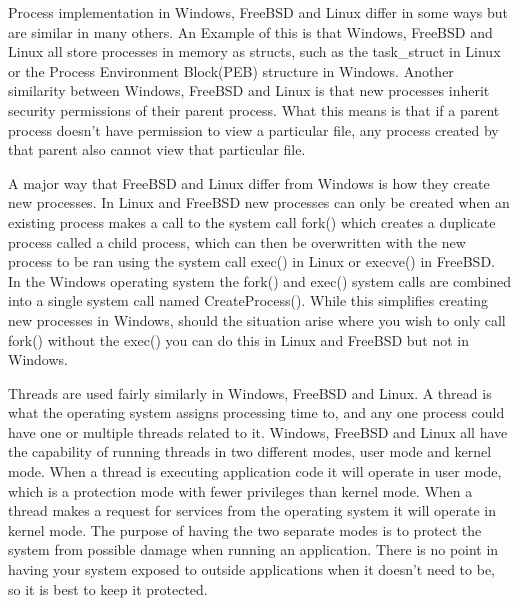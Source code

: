 \documentclass[10pt,serif,draftclsnofoot,onecolumn]{IEEEtran}
\begin{document}
	\par
			Process implementation in Windows, FreeBSD and Linux differ in some ways but are similar in many others. An Example of this is that Windows, FreeBSD and Linux all store processes in memory as structs, such as the task\_struct in Linux\cite{2} or the Process Environment Block(PEB) structure in Windows\cite{3}. Another similarity between Windows, FreeBSD and Linux is that new processes inherit security permissions of their parent process\cite{4}. What this means is that if a parent process doesn't have permission to view a particular file, any process created by that parent also cannot view that particular file.
	\newline
	\newline
	\par
			A major way that FreeBSD and Linux differ from Windows is how they create new processes. In Linux and FreeBSD new processes can only be created when an existing process makes a call to the system call fork() which creates a duplicate process called a child process, which can then be overwritten with the new process to be ran using the system call exec() in Linux or execve() in FreeBSD\cite{1}. In the Windows operating system the fork() and exec() system calls are combined into a single system call named CreateProcess()\cite{4}. While this simplifies creating new processes in Windows, should the situation arise where you wish to only call fork() without the exec() you can do this in Linux and FreeBSD but not in Windows.
	\newline
	\newline
	\par
			Threads are used fairly similarly in Windows, FreeBSD and Linux. A thread is what the operating system assigns processing time to, and any one process could have one or multiple threads related to it. Windows, FreeBSD and Linux all have the capability of running threads in two different modes, user mode and kernel mode\cite{1}. When a thread is executing application code it will operate in user mode, which is a protection mode with fewer privileges than kernel mode. When a thread makes a request for services from the operating system it will operate in kernel mode. The purpose of having the two separate modes is to protect the system from possible damage when running an application. There is no point in having your system exposed to outside applications when it doesn't need to be, so it is best to keep it protected.
	\newline
	\newline
\end{document}

